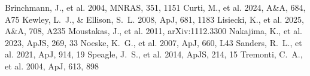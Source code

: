 \documentclass[twocolumn]{aastex631}
\begin{document}
\begin{thebibliography}{}
 Brinchmann, J., et al. 2004, MNRAS, 351, 1151
 Curti, M., et al. 2024, A\&A, 684, A75
 Kewley, L.~J., \& Ellison, S.~L. 2008, ApJ, 681, 1183
 Lisiecki, K., et al. 2025, A\&A, 708, A235
 Moustakas, J., et al. 2011, arXiv:1112.3300
 Nakajima, K., et al. 2023, ApJS, 269, 33
 Noeske, K.~G., et al. 2007, ApJ, 660, L43
 Sanders, R.~L., et al. 2021, ApJ, 914, 19
 Speagle, J.~S., et al. 2014, ApJS, 214, 15
 Tremonti, C.~A., et al. 2004, ApJ, 613, 898
\end{thebibliography}
\end{document}
